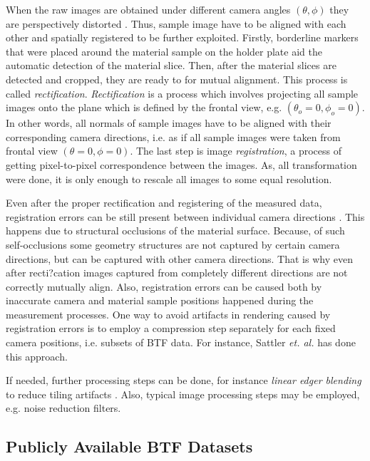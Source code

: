 When the raw images are obtained under different camera angles $(\theta,\phi)$ they are perspectively distorted \cite{sattler-2003-efficient}.
Thus, sample image have to be aligned with each other and spatially registered to be further exploited.
Firstly, borderline markers that were placed around the material sample on the holder plate aid the automatic detection of the material slice.
Then, after the material slices are detected and cropped, they are ready to for mutual alignment. This process is called  \emph{rectification}. 
\emph{Rectification} is a process which involves projecting all sample images onto the plane which is defined by the frontal view, e.g. $(\theta _{o} =0,\phi _{o}=0)$.
In other words, all normals of sample images have to be aligned with their corresponding camera directions, i.e. as if all sample images were taken from frontal view $(\theta =0,\phi=0)$.
The last step is image \emph{registration}, a process of getting pixel-to-pixel correspondence between the images.
 As, all transformation were done, it is only enough to rescale all images to some equal resolution.


Even after the proper rectification and registering of the measured data, registration errors can be still present between individual camera directions \cite{haindl_visual}. 
 This happens due to structural occlusions of the material surface. Because, of such self-occlusions some geometry structures are not captured by certain camera directions, 
 but can be captured with other camera directions.
 That is why even after recti?cation images captured from completely different directions are not correctly mutually align. 
Also, registration errors can be caused both by inaccurate camera and material sample positions happened during the measurement processes.
One way to avoid artifacts in rendering caused by registration errors is to employ a compression step separately for each fixed camera positions, i.e. subsets of BTF data. 
 For instance, Sattler  \emph{et. al.} \cite{sattler-2003-efficient} has done this approach.


If needed, further processing steps can be done, for instance \emph{linear edger blending} to reduce tiling artifacts \cite{sattler-2003-efficient}.
Also, typical image processing steps may be employed, e.g. noise reduction filters. 


\subsection{Publicly Available BTF Datasets}
\label{section:Publicly_datasets}	

